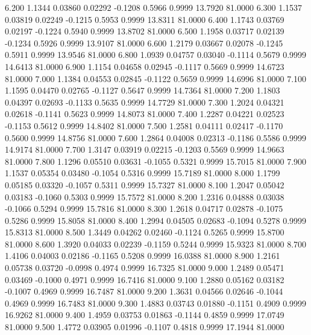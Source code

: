    6.200   1.1344   0.03860   0.02292  -0.1208   0.5966   0.9999  13.7920  81.0000
   6.300   1.1537   0.03819   0.02249  -0.1215   0.5953   0.9999  13.8311  81.0000
   6.400   1.1743   0.03769   0.02197  -0.1224   0.5940   0.9999  13.8702  81.0000
   6.500   1.1958   0.03717   0.02139  -0.1234   0.5926   0.9999  13.9107  81.0000
   6.600   1.2179   0.03667   0.02078  -0.1245   0.5911   0.9999  13.9546  81.0000
   6.800   1.0939   0.04757   0.03040  -0.1114   0.5679   0.9999  14.6413  81.0000
   6.900   1.1154   0.04658   0.02945  -0.1117   0.5669   0.9999  14.6723  81.0000
   7.000   1.1384   0.04553   0.02845  -0.1122   0.5659   0.9999  14.6996  81.0000
   7.100   1.1595   0.04470   0.02765  -0.1127   0.5647   0.9999  14.7364  81.0000
   7.200   1.1803   0.04397   0.02693  -0.1133   0.5635   0.9999  14.7729  81.0000
   7.300   1.2024   0.04321   0.02618  -0.1141   0.5623   0.9999  14.8073  81.0000
   7.400   1.2287   0.04221   0.02523  -0.1153   0.5612   0.9999  14.8402  81.0000
   7.500   1.2581   0.04111   0.02417  -0.1170   0.5600   0.9999  14.8756  81.0000
   7.600   1.2864   0.04008   0.02313  -0.1186   0.5586   0.9999  14.9174  81.0000
   7.700   1.3147   0.03919   0.02215  -0.1203   0.5569   0.9999  14.9663  81.0000
   7.800   1.1296   0.05510   0.03631  -0.1055   0.5321   0.9999  15.7015  81.0000
   7.900   1.1537   0.05354   0.03480  -0.1054   0.5316   0.9999  15.7189  81.0000
   8.000   1.1799   0.05185   0.03320  -0.1057   0.5311   0.9999  15.7327  81.0000
   8.100   1.2047   0.05042   0.03183  -0.1060   0.5303   0.9999  15.7572  81.0000
   8.200   1.2316   0.04888   0.03038  -0.1066   0.5294   0.9999  15.7816  81.0000
   8.300   1.2618   0.04717   0.02878  -0.1075   0.5286   0.9999  15.8058  81.0000
   8.400   1.2994   0.04505   0.02683  -0.1094   0.5278   0.9999  15.8313  81.0000
   8.500   1.3449   0.04262   0.02460  -0.1124   0.5265   0.9999  15.8700  81.0000
   8.600   1.3920   0.04033   0.02239  -0.1159   0.5244   0.9999  15.9323  81.0000
   8.700   1.4106   0.04003   0.02186  -0.1165   0.5208   0.9999  16.0388  81.0000
   8.900   1.2161   0.05738   0.03720  -0.0998   0.4974   0.9999  16.7325  81.0000
   9.000   1.2489   0.05471   0.03469  -0.1000   0.4971   0.9999  16.7416  81.0000
   9.100   1.2880   0.05162   0.03182  -0.1007   0.4969   0.9999  16.7487  81.0000
   9.200   1.3631   0.04566   0.02646  -0.1044   0.4969   0.9999  16.7483  81.0000
   9.300   1.4883   0.03743   0.01880  -0.1151   0.4909   0.9999  16.9262  81.0000
   9.400   1.4959   0.03753   0.01863  -0.1144   0.4859   0.9999  17.0749  81.0000
   9.500   1.4772   0.03905   0.01996  -0.1107   0.4818   0.9999  17.1944  81.0000
